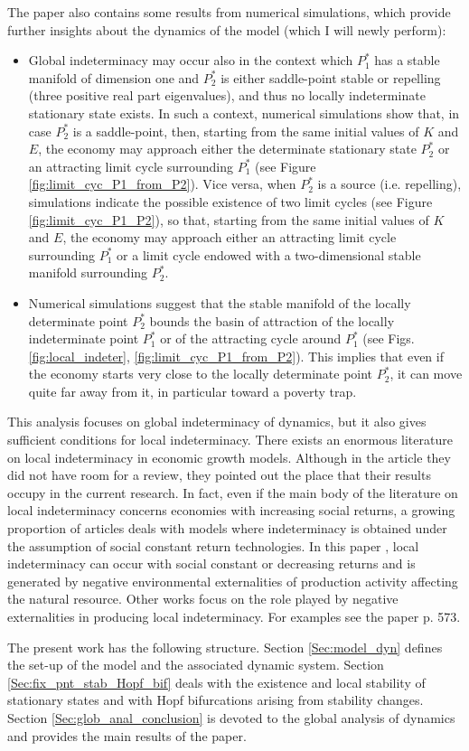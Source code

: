 The paper \cite{antoci_poverty_2011} also contains some results from numerical simulations, which provide further insights about the dynamics of the model (which I will newly perform):
\begin{itemize}
	\item Global indeterminacy may occur also in the context which $P_1^*$ has a stable manifold of dimension one and $P_2^*$ is either saddle-point stable or repelling (three positive real part eigenvalues), and thus no locally indeterminate stationary state exists. In such a context, numerical simulations show that, in case $P_2^*$ is a saddle-point, then, starting from the same initial values of $K$ and $E$, the economy may approach either the determinate stationary state $P_2^*$ or an attracting limit cycle surrounding $P_1^*$ (see Figure \ref{fig:limit_cyc_P1_from_P2}). Vice versa, when $P_2^*$ is a source (i.e. repelling), simulations indicate the possible existence of two limit cycles (see Figure \ref{fig:limit_cyc_P1_P2}), so that, starting from the same initial values of $K$ and $E$, the economy may approach either
	an attracting limit cycle surrounding $P_1^*$ or a limit cycle endowed with a two-dimensional stable manifold surrounding $P_2^*$.
	\item Numerical simulations suggest that the stable manifold of the locally determinate point $P_2^*$ bounds the basin of attraction of the locally indeterminate point $P_1^*$ or of the attracting cycle around $P_1^*$ (see Figs. \ref{fig:local_indeter}, \ref{fig:limit_cyc_P1_from_P2}). This implies that even if the economy starts very close to the locally determinate point $P_2^*$, it can move quite far away from it, in particular toward a poverty trap.
\end{itemize}

This analysis focuses on global indeterminacy of dynamics, but it also gives sufficient conditions for local indeterminacy. There exists an enormous literature on local indeterminacy in economic growth models. Although in the article \cite{antoci_poverty_2011} they did not have room for a review, they pointed out the place that their results occupy in the current research. In fact, even if the main body of the literature on local indeterminacy concerns economies with increasing social returns, a growing proportion of articles deals with models where indeterminacy is obtained under the assumption of social constant return technologies. In this paper \cite{antoci_poverty_2011}, local indeterminacy can occur with social constant or decreasing returns and is generated by negative environmental externalities of production activity affecting the natural resource. Other works focus on the role played by negative externalities in producing local  indeterminacy. For examples see the paper \cite{antoci_poverty_2011} p. 573.

The present work has the following structure. Section \ref{Sec:model_dyn} defines the set-up of the model and the associated dynamic system. Section \ref{Sec:fix_pnt_stab_Hopf_bif} deals with the existence and local stability of stationary states and with Hopf bifurcations arising from stability changes. Section \ref{Sec:glob_anal_conclusion} is devoted to the global analysis of dynamics and provides the main results of the paper. 

